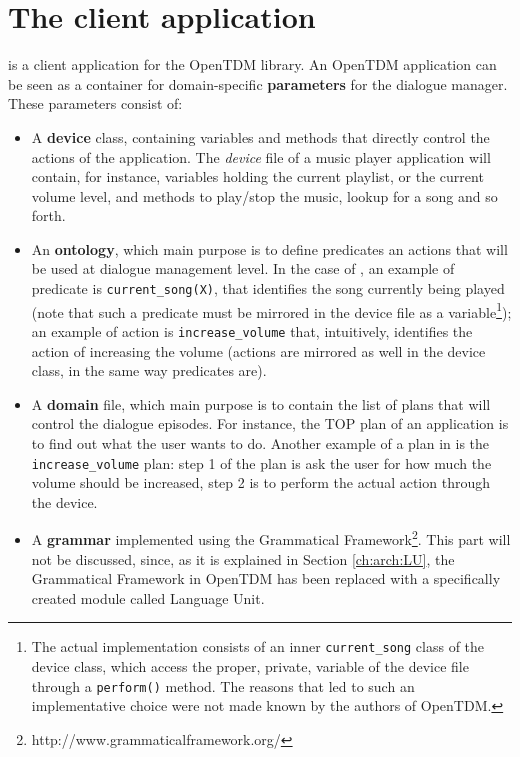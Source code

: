 \section{The client application} \label{ch:arch:client}
\pname is a client application for the OpenTDM library. An OpenTDM application can be seen as a container for domain-specific \textbf{parameters} for the dialogue manager. These parameters consist of:
\begin{itemize}
\item A \textbf{device} class, containing variables and methods that directly control the actions of the application. The \textit{device} file of a music player application will contain, for instance, variables holding the current playlist, or the current volume level, and methods to play/stop the music, lookup for a song and so forth.
\item An \textbf{ontology}, which main purpose is to define predicates an actions that will be used at dialogue management level. In the case of \pname, an example of predicate is \texttt{current\_song(X)}, that identifies the song currently being played (note that such a predicate must be mirrored in the device file as a variable\footnote{The actual implementation consists of an inner \texttt{current\_song} class of the device class, which access the proper, private, variable of the device file through a \texttt{perform()} method. The reasons that led to such an implementative choice were not made known by the authors of OpenTDM.}); an example of action is \texttt{increase\_volume} that, intuitively, identifies the action of increasing the volume (actions are mirrored as well in the device class, in the same way predicates are).
\item A \textbf{domain} file, which main purpose is to contain the list of plans that will control the dialogue episodes. For instance, the TOP plan of an application is to find out what the user wants to do. Another example of a plan in \pname is the \texttt{increase\_volume} plan: step 1 of the plan is ask the user for how much the volume should be increased, step 2 is to perform the actual action through the device.
\item A \textbf{grammar} implemented using the Grammatical Framework\footnote{http://www.grammaticalframework.org/}. This part will not be discussed, since, as it is explained in Section \ref{ch:arch:LU}, the Grammatical Framework in OpenTDM has been replaced with a specifically created module called Language Unit.
\end{itemize}

